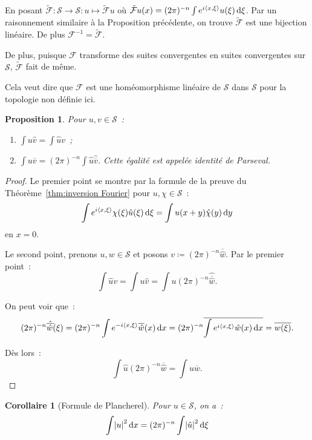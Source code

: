 \documentclass{report}
\newcommand{\scpr}[2]{\left\langle#1, #2\right\rangle}
\newcommand{\dx}{\dif x}
\newtheorem{prp}[thm]{Proposition}
\newtheorem{cor}[thm]{Corollaire}
\theoremstyle{definition}
\theoremstyle{remark}
\begin{document}
En posant $\tilde {\mathcal F} : \mathcal S \to \mathcal S : u \mapsto \tilde {\mathcal F}u$ où $\tilde {\mathcal F}u(x) = (2\pi)^{-n}\int e^{i\scpr x\xi}u(\xi)\dif\xi$.
Par un raisonnement similaire à la Proposition précédente, on trouve $\tilde {\mathcal F}$ est une bijection linéaire. De plus $\mathcal F^{-1} = \tilde {\mathcal F}$.

De plus, puisque $\mathcal F$ transforme des suites convergentes en suites convergentes sur $\mathcal S$, $\tilde {\mathcal F}$ fait de même.

Cela veut dire que $\mathcal F$ est une homéomorphisme linéaire de $\mathcal S$ dans $\mathcal S$ pour la topologie non définie ici.

\begin{prp} Pour $u, v \in \mathcal S$~:
\begin{enumerate}
	\item $\int u\hat v = \int\hat uv$~;
	\item $\int u\overline v = (2\pi)^{-n}\int \hat u\hat {\overline v}$. Cette égalité est appelée \textit{identité de Parseval}.
\end{enumerate}
\end{prp}

\begin{proof} Le premier point se montre par la formule de la preuve du Théorème~\ref{thm:inversion Fourier} pour $u,\chi \in \mathcal S$~:
\[\int e^{i\scpr x\xi}\chi(\xi)\hat u(\xi)\dif\xi = \int u(x+y)\hat \chi(y)\dif y\]
en $x=0$.

Le second point, prenons $u, w \in \mathcal S$ et posons $v \coloneqq (2\pi)^{-n}\overline {\hat w}$. Par le premier point~:
\[\int \hat uv = \int u\hat v = \int u(2\pi)^{-n}\hat {\overline {\hat w}}.\]

On peut voir que~:
\[(2\pi)^{-n}\hat {\overline {\hat w}}(\xi) = (2\pi)^{-n}\int e^{-i\scpr x\xi}\overline {\hat w}(x)\dx =
	(2\pi)^{-n}\overline {\int e^{i\scpr x\xi}\hat w(x)\dx} = \overline {w(\xi)}.\]

Dès lors~:
\[\int \hat u(2\pi)^{-n}\overline {\hat w} = \int u\overline w.\]
\end{proof}

\begin{cor}[Formule de Plancherel] Pour $u \in \mathcal S$, on a~:
\begin{equation}\label{eq:Plancherel}
	\int \abs u^2\dx = (2\pi)^{-n}\int\abs {\hat u}^2\dif\xi
\end{equation}
\end{cor}
\end{document}
